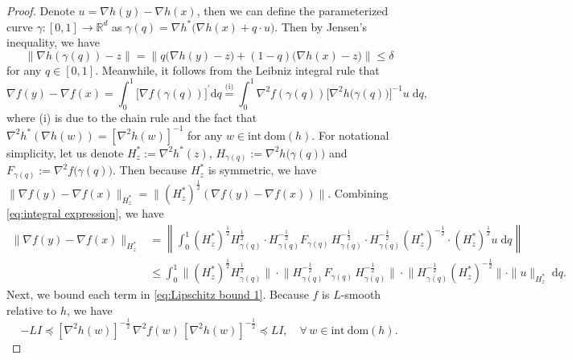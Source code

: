 \documentclass{article}
\theoremstyle{plain}
\theoremstyle{definition}
\theoremstyle{remark}
\newcommand{\Rd}{\mathbb{R}^d}
\newcommand{\sL}{L}
\newcommand{\idom}[1]{\mathrm{int\ dom}(#1)}
\begin{document}
\begin{proof}
    Denote $u =\nabla h(y) - \nabla h(x)$, then we can define the parameterized curve $\gamma:[0,1] \to \Rd$ as $\gamma(q) = \nabla h^*\big(\nabla h(x) + q \cdot u\big)$. Then by Jensen's inequality, we have 
    \begin{equation}\label{eq:distance to curve}
    \left\|\nabla h(\gamma(q)) - z\right\| = \big\|q\big(\nabla h(y) - z\big) + (1-q)\big(\nabla h(x) - z\big) \big\| \leq \delta
    \end{equation}
    for any $q\in[0,1]$. Meanwhile, it follows from the Leibniz integral rule that
    \begin{equation}
        \label{eq:integral expression}
        \nabla f(y) - \nabla f(x) = \!\int_{0}^1 \!\big[\nabla f(\gamma(q)) \big]^\prime   \mathrm{d}q \overset{\text{(i)}}{=} \!\int_0^1 \!\nabla^2 f(\gamma(q))  \big[\nabla^2 h\big(\gamma(q)\big)\big]^{-1} \!  u \; \mathrm{d}q,
    \end{equation}  
    where (i) is due to the chain rule and the fact that $\nabla^2 h^*(\nabla h(w))=[\nabla^2 h(w)]^{-1}$ for any $w\in\idom{h}$. For notational simplicity, let us denote $H^*_z:=\nabla^2 h^*(z)$, $H_{\gamma(q)}:=\nabla^2 h\big(\gamma(q)\big)$ and $F_{\gamma(q)}:=\nabla^2 f\big(\gamma(q)\big)$. 
    Then because $H^*_z$ is symmetric, we have $\|\nabla f(y) - \nabla f(x)\|_{H_z^*} =  \|(H_z^*)^{\frac12}  (\nabla f(y) - \nabla f(x))\|$. Combining \eqref{eq:integral expression}, we have
    \begin{equation}\label{eq:Lipschitz bound 1}
    \begin{aligned}
          \big\|\nabla f(y) \!-\! \nabla f(x)\big\|_{H^*_z} & = \left\|\int_0^1 \!\!(H_z^*)^{\frac12}  H_{\gamma(q)}^{\frac12} \!\cdot H_{\gamma(q)}^{-\frac12} F_{\gamma(q)} \, H_{\gamma(q)}^{-\frac12} \!\cdot H_{\gamma(q)}^{-\frac12}(H_z^*)^{-\frac12}\!\cdot (H_z^*)^{\frac12} u\;\mathrm{d}q \right\|\\
         & \leq \int_0^1 \!\big\| (H_z^*)^{\frac12}  H_{\gamma(q)}^{\frac12}\big\| \cdot \big\| H_{\gamma(q)}^{-\frac12} F_{\gamma(q)} \, H_{\gamma(q)}^{-\frac12}\big\| \cdot \big\|H_{\gamma(q)}^{-\frac12}(H_z^*)^{-\frac12}\big\| \cdot \|u\|_{H_z^*}\; \mathrm{d}q.
    \end{aligned}
      \end{equation}
    Next, we bound each term in \eqref{eq:Lipschitz bound 1}. Because $f$ is $\sL$-smooth relative to $h$, we have 
\[
-\sL I \preceq [\nabla^2 h(w)]^{-\frac12}\, \nabla^2 f(w) \, [\nabla^2 h(w)]^{-\frac12} \preceq \sL I,\quad \forall \, w\in\idom{h}.
\]
\end{proof}
\end{document}
